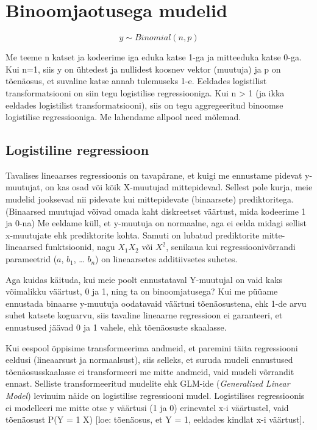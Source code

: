 \documentclass[]{book}
\begin{document}
\section{Binoomjaotusega mudelid}\label{binoomjaotusega-mudelid}

\[y \sim Binomial(n, p)\]

Me teeme n katset ja kodeerime iga eduka katse 1-ga ja mitteeduka katse
0-ga. Kui n=1, siis y on ühtedest ja nullidest koosnev vektor (muutuja)
ja p on tõenäosus, et suvaline katse annab tulemuseks 1-e. Eeldades
logistilist transformatsiooni on siin tegu logistilise regressiooniga.
Kui n \textgreater{} 1 (ja ikka eeldades logistilist transformatsiooni),
siis on tegu aggregeeritud binoomse logistilise regressiooniga. Me
lahendame allpool need mõlemad.

\subsection{Logistiline regressioon}\label{logistiline-regressioon}

Tavalises lineaarses regressioonis on tavapärane, et kuigi me ennustame
pidevat y-muutujat, on kas osad või kõik X-muutujad mittepidevad.
Sellest pole kurja, meie mudelid jooksevad nii pidevate kui
mittepidevate (binaarsete) prediktoritega. (Binaarsed muutujad võivad
omada kaht diskreetset väärtust, mida kodeerime 1 ja 0-na) Me eeldame
küll, et y-muutuja on normaalne, aga ei eelda midagi sellist x-muutujate
ehk prediktorite kohta. Samuti on lubatud prediktorite mitte-lineaarsed
funktsioonid, nagu \(X_1 X_2\) või \(X^2\), senikaua kui
regressioonivõrrandi parameetrid (\(a\), \(b_1\), \ldots{} \(b_n\)) on
lineaarsetes additiivsetes suhetes.

Aga kuidas käituda, kui meie poolt ennustataval Y-muutujal on vaid kaks
võimalikku väärtust, 0 ja 1, ning ta on binoomjatusega? Kui me püüame
ennustada binaarse y-muutuja oodatavaid väärtusi tõenäosustena, ehk 1-de
arvu suhet katsete koguarvu, siis tavaline lineaarne regressioon ei
garanteeri, et ennustused jäävad 0 ja 1 vahele, ehk tõenäosuste
skaalasse.

Kui eespool õppisime transformeerima andmeid, et paremini täita
regressiooni eeldusi (lineaarsust ja normaalsust), siis selleks, et
suruda mudeli ennustused tõenäosusskaalasse ei transformeeri me mitte
andmeid, vaid mudeli võrrandit ennast. Selliste transformeeritud
mudelite ehk GLM-ide (\emph{Generalized Linear Model}) levinuim näide on
logistilise regressiooni mudel. Logistilises regressioonis ei modelleeri
me mitte otse y väärtusi (1 ja 0) erinevatel x-i väärtustel, vaid
tõenäosust P(Y = 1 \textbar{} X) {[}loe: tõenäosus, et Y = 1, eeldades
kindlat x-i väärtust{]}.
\end{document}
